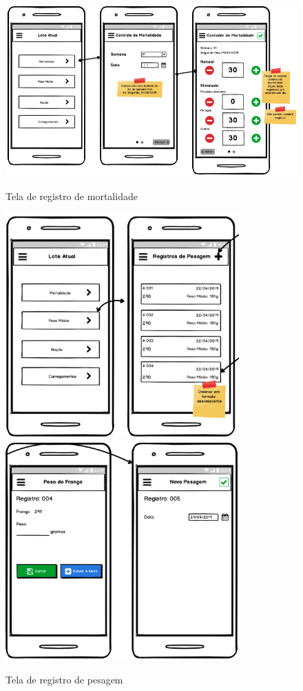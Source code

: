 \begin{anexosenv}
\begin{figure}[h]
    \centering
    \caption{Tela de registro de mortalidade}
    \includegraphics[width=1.0\textwidth]{./dados/figuras/p4.png}
    \label{fig:p4}
\end{figure}

\begin{figure}[h]
    \centering
    \caption{Tela de registro de pesagem}
    \includegraphics[width=0.8\textwidth]{./dados/figuras/p5.png}
    \includegraphics[width=0.8\textwidth]{./dados/figuras/p5_1.png}
    \label{fig:p5}
\end{figure}


\end{anexosenv}
